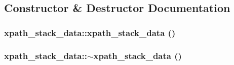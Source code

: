 \subsection{Constructor \& Destructor Documentation}
\hypertarget{structxpath__stack__data_aba4a588075a5ec45a3aa661b97d62ca6}{
\subsubsection[{xpath\_\-stack\_\-data}]{\setlength{\rightskip}{0pt plus 5cm}xpath\_\-stack\_\-data::xpath\_\-stack\_\-data ()}}
\label{structxpath__stack__data_aba4a588075a5ec45a3aa661b97d62ca6}
\hypertarget{structxpath__stack__data_a1df4e020ecc629b398336969c8490d98}{
\subsubsection[{$\sim$xpath\_\-stack\_\-data}]{\setlength{\rightskip}{0pt plus 5cm}xpath\_\-stack\_\-data::$\sim$xpath\_\-stack\_\-data ()}}
\label{structxpath__stack__data_a1df4e020ecc629b398336969c8490d98}


